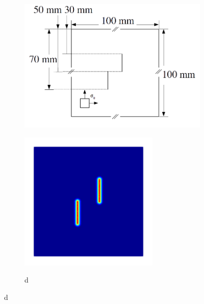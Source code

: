 \begin{figure}[htb!]
  \centering
  \begin{subfigure}[b]{0.38\textwidth}
    \centering
    \includegraphics[width=\textwidth,scale=0.5]{Chapter4/figures/biaxial_dimensions.png}
    \caption{}
    \label{fig: Chapter4/biaxial_dimensions}
  \end{subfigure}
  \begin{subfigure}[b]{0.325\textwidth}
    \centering
    \includegraphics[width=0.73\textwidth,scale=0.5]{Chapter4/figures/biaxial_initial.png}
    \caption{}
    \label{fig: Chapter4/biaxial_initial}
  \end{subfigure}
  \begin{subfigure}[b]{0.07\textwidth}
    \centering
    \caption*{d}

\end{subfigure}
\end{figure}
